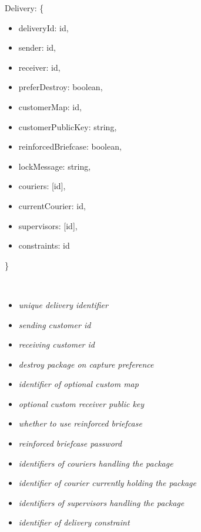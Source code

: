 \begin{minipage}{6.5cm}
    Delivery: \{
    \begin{itemize}
        \itemsep-0.5em
        \item[] deliveryId: id,
        \item[] sender: id,
        \item[] receiver: id,
        \item[] preferDestroy: boolean,
        \item[] customerMap: id,
        \item[] customerPublicKey: string,
        \item[] reinforcedBriefcase: boolean,
        \item[] lockMessage: string,
        \item[] couriers: [id],
        \item[] currentCourier: id,
        \item[]  supervisors: [id],
        \item[] constraints: id
    \end{itemize}
    \}
\end{minipage}
\begin{minipage}{10cm}
    \hspace{1cm} \\
    \begin{itemize}
        \itemsep-0.5em
        \item[] \textit{unique delivery identifier}
        \item[] \textit{sending customer id}
        \item[] \textit{receiving customer id}
        \item[] \textit{destroy package on capture preference}
        \item[] \textit{identifier of optional custom map}
        \item[] \textit{optional custom receiver public key}
        \item[] \textit{whether to use reinforced briefcase}
        \item[] \textit{reinforced briefcase password}
        \item[] \textit{identifiers of couriers handling the package}
        \item[] \textit{identifier of courier currently holding the package}
        \item[] \textit{identifiers of supervisors handling the package}
        \item[] \textit{identifier of delivery constraint}
    \end{itemize}
    \hspace{1cm} \\
\end{minipage}

